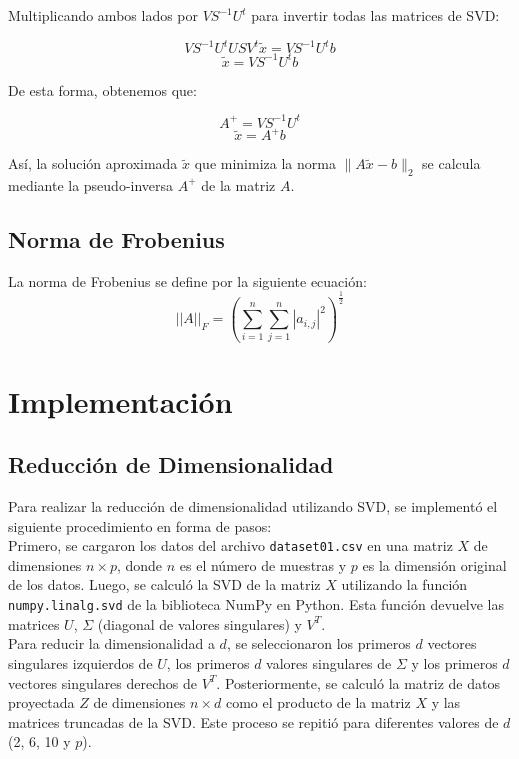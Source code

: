 \documentclass[12pt,a4]{article} %
\begin{document}
Multiplicando ambos lados por $VS^{-1}U^t$ para invertir todas las matrices de SVD:

\[
VS^{-1}U^tUSV^t\tilde{x} = VS^{-1}U^tb
\]
\[
\tilde{x} = VS^{-1}U^tb
\]

De esta forma, obtenemos que:

\[
A^+ = VS^{-1}U^t
\]
\[
\tilde{x} = A^+b
\]

Así, la solución aproximada $\tilde{x}$ que minimiza la norma $\|A\tilde{x} - b\|_2$ se calcula mediante la pseudo-inversa $A^+$ de la matriz $A$.
\\

\subsection{Norma de Frobenius}
\label{Frobenius}
La norma de Frobenius se define por la siguiente ecuación:
\begin{equation}
    ||A||_F = \left(\sum_{i=1}^{n}\sum_{j=1}^{n} |a_{i,j}|^{2}\right)^{\frac{1}{2}}
\end{equation}

\section{Implementación}
\subsection{Reducción de Dimensionalidad}
Para realizar la reducción de dimensionalidad utilizando SVD, se implementó el siguiente procedimiento en forma de pasos:
\\

Primero, se cargaron los datos del archivo \texttt{dataset01.csv} en una matriz $X$ de dimensiones $n \times p$, donde $n$ es el número de muestras y $p$ es la dimensión original de los datos. Luego, se calculó la SVD de la matriz $X$ utilizando la función \texttt{numpy.linalg.svd} de la biblioteca NumPy en Python. Esta función devuelve las matrices $U$, $\Sigma$ (diagonal de valores singulares) y $V^T$.
\\

Para reducir la dimensionalidad a $d$, se seleccionaron los primeros $d$ vectores singulares izquierdos de $U$, los primeros $d$ valores singulares de $\Sigma$ y los primeros $d$ vectores singulares derechos de $V^T$. Posteriormente, se calculó la matriz de datos proyectada $Z$ de dimensiones $n \times d$ como el producto de la matriz $X$ y las matrices truncadas de la SVD. Este proceso se repitió para diferentes valores de $d$ (2, 6, 10 y $p$).
\end{document}
